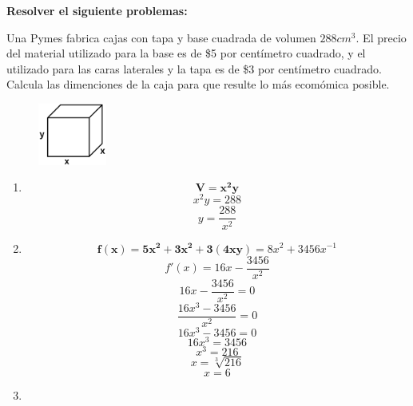 \documentclass[12pt]{article}
\begin{document}
    

    \textbf{Resolver el siguiente problemas: }

    Una Pymes fabrica cajas con tapa y base cuadrada de volumen $288cm^3$. El precio del material utilizado para la base es de \$5 por centímetro cuadrado, y el utilizado para las caras laterales y la tapa es de \$3 por centímetro cuadrado. Calcula las dimenciones de la caja para que resulte lo más ecomómica posible.

    \begin{figure}[h!]
        \centering
        \includegraphics[width=0.2\textwidth]{img/t4.png}
    \end{figure}

    \begin{enumerate}[label=\textbf{\arabic*)}] 
        \item \[\bm{V = x^2y}\]
            \[x^2y = 288\]
            \[y = \frac{288}{x^2}\]

        \item \[\bm{f(x) = 5x^2 + 3x^2 + 3(4xy)} = 8x^2 + 3456x^{-1}\]
            \[f'(x) = 16x - \frac{3456}{x^2}\]
            \[16x - \frac{3456}{x^2} = 0\]
            \[\frac{16x^3 - 3456}{x^2} = 0\]
            \[16x^3 - 3456 = 0\]
            \[16x^3 = 3456\]
            \[x^3 = 216\]
            \[x = \sqrt[3]{216}\]
            \[x = 6\]

        \item 
    \end{enumerate}
\end{document}
